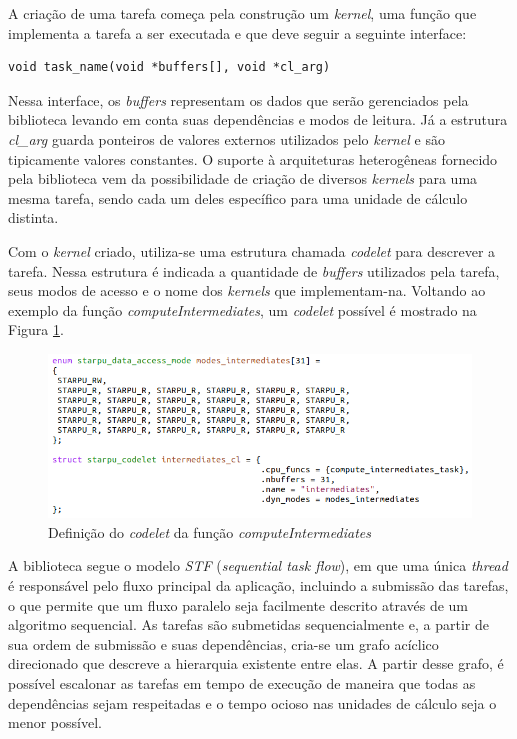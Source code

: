 \documentclass[cic,tc]{iiufrgs}
\begin{document}
A criação de uma tarefa começa pela construção um \textit{kernel}, uma função que implementa a tarefa a ser executada e que deve seguir a seguinte interface:

\begin{verbatim}
void task_name(void *buffers[], void *cl_arg)
\end{verbatim}

Nessa interface, os \textit{buffers} representam os dados que serão gerenciados pela biblioteca levando em conta suas dependências e modos de leitura. Já a estrutura
\textit{cl\_arg} guarda ponteiros de valores externos utilizados pelo \textit{kernel} e são tipicamente valores constantes. O suporte à arquiteturas heterogêneas fornecido pela
biblioteca vem da possibilidade de criação de diversos \textit{kernels} para uma mesma tarefa, sendo cada um deles específico para uma unidade de cálculo distinta.

Com o \textit{kernel} criado, utiliza-se uma estrutura chamada \textit{codelet} para descrever a tarefa. Nessa estrutura é indicada a quantidade de \textit{buffers} utilizados
pela tarefa, seus modos de acesso e o nome dos \textit{kernels} que implementam-na. Voltando ao exemplo da função \textit{computeIntermediates}, um \textit{codelet}
possível é mostrado na Figura \ref{fig:intermediates_cl}.

\begin{figure}[!htb]
    \caption{Definição do \textit{codelet} da função \textit{computeIntermediates}}
    \begin{center}
      \includegraphics[width=32em]{intermediates_cl}
    \end{center}
    \label{fig:intermediates_cl}
\end{figure}

A biblioteca segue o modelo \textit{STF} (\textit{sequential task flow}), em que uma única \textit{thread} é responsável pelo fluxo principal da aplicação, incluindo a submissão das tarefas,
o que permite que um fluxo paralelo seja facilmente descrito através de um algoritmo sequencial. As tarefas são submetidas sequencialmente e, a partir de sua ordem de submissão e suas dependências,
cria-se um grafo acíclico direcionado que descreve a hierarquia existente entre elas. A partir desse grafo, é possível escalonar as tarefas em tempo de execução de maneira que todas as dependências
sejam respeitadas e o tempo ocioso nas unidades de cálculo seja o menor possível.
\end{document}
